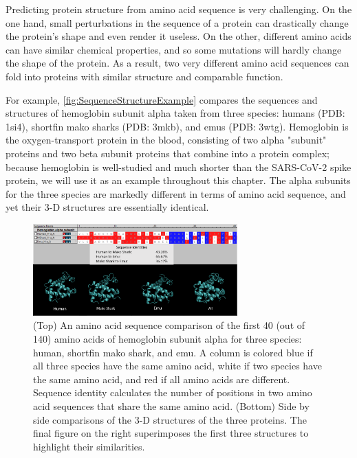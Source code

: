Predicting protein structure from amino acid sequence is very challenging. On the one hand, small perturbations in the sequence of a protein can drastically change the protein's shape and even render it useless. On the other, different amino acids can have similar chemical properties, and so some mutations will hardly change the shape of the protein. As a result, two very different amino acid sequences can fold into proteins with similar structure and comparable function.

For example, \autoref{fig:SequenceStructureExample} compares the sequences and structures of hemoglobin subunit alpha taken from three species: humans (PDB: 1si4), shortfin mako sharks (PDB: 3mkb), and emus (PDB: 3wtg). Hemoglobin is the oxygen-transport protein in the blood, consisting of two alpha "subunit" proteins and two beta subunit proteins that combine into a protein complex; because hemoglobin is well-studied and much shorter than the SARS-CoV-2 spike protein, we will use it as an example throughout this chapter. The alpha subunits for the three species are markedly different in terms of amino acid sequence, and yet their 3-D structures are essentially identical.

\begin{figure}[h]
	\centering
	\mySfFamily
	\includegraphics[width = 0.7\textwidth]{../images/SequenceStructureExample.png}
	\caption{(Top) An amino acid sequence comparison of the first 40 (out of 140) amino acids of hemoglobin subunit alpha for three species: human, shortfin mako shark, and emu. A column is colored blue if all three species have the same amino acid, white if two species have the same amino acid, and red if all amino acids are different. Sequence identity calculates the number of positions in two amino acid sequences that share the same amino acid. (Bottom) Side by side comparisons of the 3-D structures of the three proteins. The final figure on the right superimposes the first three structures to highlight their similarities.}
	\label{fig:SequenceStructureExample}
\end{figure}

